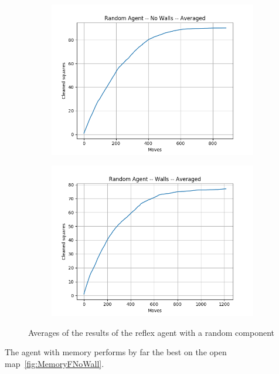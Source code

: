 \documentclass[12pt]{article}
\begin{document}
\begin{figure}[!h]
	\centering
	\begin{subfigure}[t]{.48\textwidth}
		\includegraphics[scale=.4]{RandomAgent1Mean}
		\label{fig:RandomNoWall}
	\end{subfigure}
	\hfill
	\begin{subfigure}[t]{.48\textwidth}
		\includegraphics[scale=.4]{RandomAgent2Mean}
		\label{fig:RandomWall}
	\end{subfigure}
	\caption{Averages of the results of the reflex agent with a random component}
	\label{f:Randomless}	
\end{figure}

The agent with memory performs by far the best on the open map~\ref{fig:MemoryFNoWall}.
\end{document}
